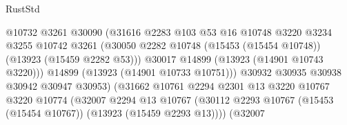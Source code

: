\begin{lexlean}{RustStd}
\begin{coremodule}
                                            @10732
                                            @3261
                                            @30090
                                            (@31616
                                              @2283
                                              @103
                                              @53
                                              @16
                                              @10748
                                              @3220
                                              @3234
                                              @3255
                                              @10742
                                              @3261
                                              (@30050
                                                @2282
                                                @10748
                                                (@15453 (@15454 @10748))
                                                (@13923 (@15459 @2282 @53)))
                                              @30017
                                              @14899
                                              (@13923 (@14901 @10743 @3220)))
                                            @14899
                                            (@13923 (@14901 @10733 @10751)))
                                          @30932
                                          @30935
                                          @30938
                                          @30942
                                          @30947
                                          @30953)
                                        (@31662
                                          @10761
                                          @2294
                                          @2301
                                          @13
                                          @3220
                                          @10767
                                          @3220
                                          @10774
                                          (@32007
                                            @2294
                                            @13
                                            @10767
                                            (@30112
                                              @2293
                                              @10767
                                              (@15453 (@15454 @10767))
                                              (@13923 (@15459 @2293 @13))))
                                          (@32007

\end{coremodule}
\end{lexlean}
